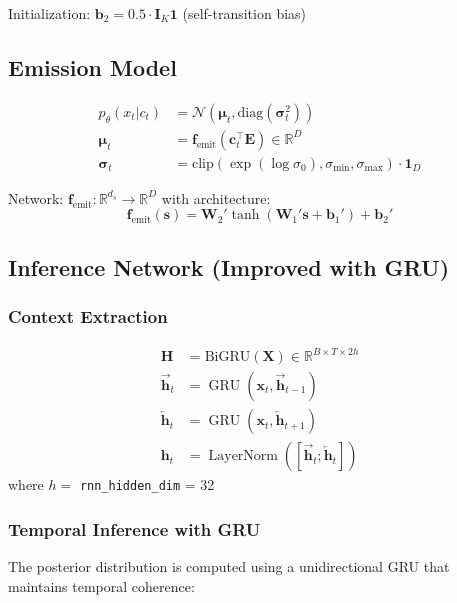 \documentclass[11pt]{article}
\DeclareMathOperator{\GRU}{GRU}
\DeclareMathOperator{\LayerNorm}{LayerNorm}
\begin{document}
Initialization: $\mathbf{b}_2 = 0.5 \cdot \mathbf{I}_K \mathbf{1}$ (self-transition bias)

\subsection{Emission Model}
\begin{align}
p_\theta(x_t | c_t) &= \mathcal{N}(\bm{\mu}_t, \text{diag}(\bm{\sigma}_t^2)) \\
\bm{\mu}_t &= \mathbf{f}_{\text{emit}}(\mathbf{c}_t^\top \mathbf{E}) \in \mathbb{R}^D \\
\bm{\sigma}_t &= \text{clip}(\exp(\log \sigma_0), \sigma_{\min}, \sigma_{\max}) \cdot \mathbf{1}_D
\end{align}

Network: $\mathbf{f}_{\text{emit}} : \mathbb{R}^{d_s} \to \mathbb{R}^D$ with architecture:
\begin{equation}
\mathbf{f}_{\text{emit}}(\mathbf{s}) = \mathbf{W}_2' \tanh(\mathbf{W}_1' \mathbf{s} + \mathbf{b}_1') + \mathbf{b}_2'
\end{equation}

\subsection{Inference Network (Improved with GRU)}

\subsubsection{Context Extraction}
\begin{align}
\mathbf{H} &= \text{BiGRU}(\mathbf{X}) \in \mathbb{R}^{B \times T \times 2h} \\
\overrightarrow{\mathbf{h}}_t &= \GRU(\mathbf{x}_t, \overrightarrow{\mathbf{h}}_{t-1}) \\
\overleftarrow{\mathbf{h}}_t &= \GRU(\mathbf{x}_t, \overleftarrow{\mathbf{h}}_{t+1}) \\
\mathbf{h}_t &= \LayerNorm([\overrightarrow{\mathbf{h}}_t; \overleftarrow{\mathbf{h}}_t])
\end{align}
where $h = $ \texttt{rnn\_hidden\_dim} = 32

\subsubsection{Temporal Inference with GRU}
The posterior distribution is computed using a unidirectional GRU that maintains temporal coherence:
\end{document}

